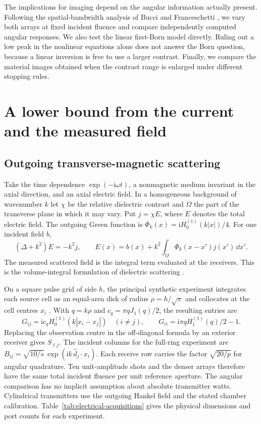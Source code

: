 \documentclass[anonymous,12pt]{iopjournal}
\numberwithin{equation}{section}
\begin{document}
The implications for imaging depend on the angular information actually present. Following the spatial-bandwidth analysis of Bucci and Franceschetti \cite{bucci87,bucci89}, we vary both arrays at fixed incident fluence and compare independently computed angular responses. We also test the linear first-Born model directly. Ruling out a low peak in the nonlinear equations alone does not answer the Born question, because a linear inversion is free to use a larger contrast. Finally, we compare the material images obtained when the contrast range is enlarged under different stopping rules.

\section{A lower bound from the current and the measured field}\label{sec:joint}

\subsection{Outgoing transverse-magnetic scattering}
Take the time dependence $\exp(-\mathrm i\omega t)$, a nonmagnetic medium invariant in the axial direction, and an axial electric field. In a homogeneous background of wavenumber $k$ let $\chi$ be the relative dielectric contrast and $\Omega$ the part of the transverse plane in which it may vary. Put $j=\chi E$, where $E$ denotes the total electric field. The outgoing Green function is $\Phi_k(x)=\mathrm i H_0^{(1)}(k|x|)/4$. For one incident field $b$,
\begin{equation}
 (\Delta+k^2)E=-k^2j,\qquad
 E(x)=b(x)+k^2\int_\Omega\Phi_k(x-x')j(x')\,\dd x'. \label{eq:wave}
\end{equation}
The measured scattered field is the integral term evaluated at the receivers. This is the volume-integral formulation of dielectric scattering \cite{colton,chenbook}.

On a square pulse grid of side $h$, the principal synthetic experiment integrates each source cell as an equal-area disk of radius $\rho=h/\sqrt{\pi}$ and collocates at the cell centres $x_i$ \cite{richmond}. With $q=k\rho$ and $c_q=\pi qJ_1(q)/2$, the resulting entries are
\begin{equation}
 G_{ij}=\mathrm i c_qH_0^{(1)}(k|x_i-x_j|)\quad(i\ne j),
 \qquad G_{ii}=\mathrm i\pi q H_1^{(1)}(q)/2-1. \label{eq:disk}
\end{equation}
Replacing the observation centre in the off-diagonal formula by an exterior receiver gives $S_{\ell j}$. The incident columns for the full-ring experiment are
$B_{ij}=\sqrt{10/s}\,\exp(\mathrm ik\,\widehat d_j\cdot x_i)$.
Each receive row carries the factor $\sqrt{20/p}$ for angular quadrature. Ten unit-amplitude shots and the denser arrays therefore have the same total incident fluence per unit reference aperture. The angular comparison has no implicit assumption about absolute transmitter watts. Cylindrical transmitters use the outgoing Hankel field and the stated chamber calibration. Table~\ref{tab:electrical-acquisitions} gives the physical dimensions and port counts for each experiment.
\end{document}
